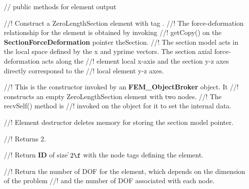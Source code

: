 
\indent    // public methods for element output

    


//! Construct a ZeroLengthSection element with \p tag .
//! The force-deformation relationship for the element is obtained by invoking
//! getCopy() on the {\bf SectionForceDeformation} pointer \p theSection.
//! The section model acts in the local space defined by the \p x and
\p yprime vectors. The section axial force-deformation acts along the 
//! element local x-axis and the section y-z axes directly corresponsd to the
//! local element y-z axes.

//! This is the constructor invoked by an {\bf FEM\_ObjectBroker} object. It
//! constructs an empty ZeroLengthSection element with two nodes.
//! The recvSelf() method is
//! invoked on the object for it to set the internal data. 


//! Element destructor deletes memory for storing the section model pointer. 


//! Returns 2.


//! Return {\bf ID} of size \f$2\f$ with the node tags defining the element.


//! Return the number of DOF for the element, which depends on the dimension of the problem
//! and the number of DOF associated with each node.



